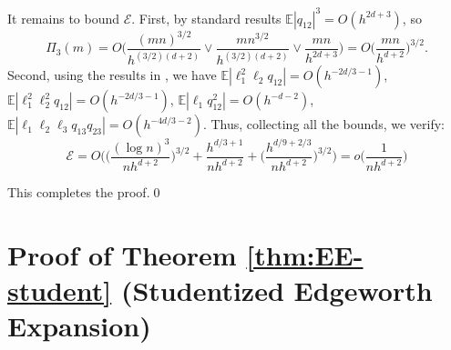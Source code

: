 \documentclass[11pt]{article}
\numberwithin{equation}{section}
\theoremstyle{definition}
\newcommand{\E}{\mathbb{E}}
\begin{document}
It remains to bound $\mathcal{E}$. First, by standard results $\E|q_{12}|^3=O(h^{2d+3})$, so
\[\Pi_3(m) =O\Big(\frac{(mn)^{3/2}}{h^{(3/2)(d+2)}}\lor \frac{m n^{3/2}}{h^{(3/2)(d+2)}}\lor \frac{mn}{h^{2d+3}}\Big)=O\Big(\frac{mn}{h^{d+2}}\Big)^{3/2}.\]
Second, using the results in \citet[Supplemental Appendix]{Cattaneo-Crump-Jansson_2014b_ET}, we have 
$\E|\ell_1^2\ell_2q_{12}|=O(h^{-2d/3-1})$, $\E|\ell_1^2\ell_2^2 q_{12}|=O(h^{-2d/3-1})$, $\E|\ell_1q_{12}^2| = O(h^{-d-2})$, $\E |\ell_1\ell_2\ell_3q_{13}q_{23}|=O(h^{-4d/3-2})$. Thus, collecting all the bounds, we verify:
\begin{equation*}
    \mathcal{E} 
     = O\Big(\Big(\frac{(\log n)^{3}}{nh^{d+2}}\Big)^{3/2} + \frac{h^{d/3+1}}{nh^{d+2}} + \Big(\frac{h^{d/9+2/3}}{nh^{d+2}}\Big)^{3/2}\Big)
     = o\Big(\frac{1}{nh^{d+2}}\Big)
\end{equation*}

This completes the proof.\qed

\section{Proof of Theorem \ref{thm:EE-student} (Studentized Edgeworth Expansion)}\label{App A: Proof for The Studentized Case}
\end{document}
